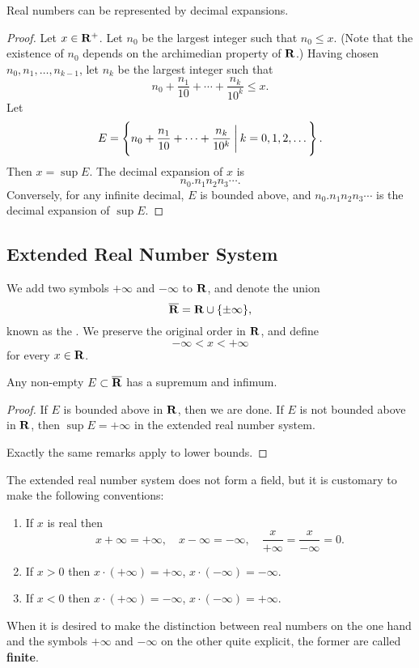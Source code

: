 \begin{proposition}
Real numbers can be represented by decimal expansions.
\end{proposition}

\begin{proof}
Let $x\in\mathbf R^+$. Let $n_0$ be the largest integer such that $n_0\le x$. (Note that the existence of $n_0$ depends on the archimedian property of $\mathbf R$.) Having chosen $n_0,n_1,\dots,n_{k-1}$, let $n_k$ be the largest integer such that
\[n_0+\frac{n_1}{10}+\cdots+\frac{n_k}{10^k}\le x.\]
Let
\[E=\left\{n_0+\frac{n_1}{10}+\cdots+\frac{n_k}{10^k}\:\bigg|\:k=0,1,2,\dots\right\}.\]
Then $x=\sup E$. The decimal expansion of $x$ is
\[n_0.n_1n_2n_3\cdots.\]
Conversely, for any infinite decimal, $E$ is bounded above, and $n_0.n_1n_2n_3\cdots$ is the decimal expansion of $\sup E$.
\end{proof}

\subsection{Extended Real Number System}
\begin{definition}
We add two symbols $+\infty$ and $-\infty$ to $\mathbf R$, and denote the union
\[\overline{\mathbf R}=\mathbf R\cup\{\pm\infty\},\]
known as the . We preserve the original order in $\mathbf R$, and define
\[-\infty<x<+\infty\]
for every $x\in\mathbf R$.
\end{definition}

\begin{proposition}
Any non-empty $E\subset\overline{\mathbf R}$ has a supremum and infimum.
\end{proposition}

\begin{proof}
If $E$ is bounded above in $\mathbf R$, then we are done. If $E$ is not bounded above in $\mathbf R$, then $\sup E=+\infty$ in the extended real number system.

Exactly the same remarks apply to lower bounds.
\end{proof}

The extended real number system does not form a field, but it is customary to make the following conventions:
\begin{enumerate}[label=(\roman*)]
\item If $x$ is real then
\[ x+\infty=+\infty, \quad x-\infty=-\infty, \quad \frac{x}{+\infty}=\frac{x}{-\infty}=0. \]
\item If $x>0$ then $x\cdot(+\infty)=+\infty$, $x\cdot(-\infty)=-\infty$.
\item If $x<0$ then $x\cdot(+\infty)=-\infty$, $x\cdot(-\infty)=+\infty$.
\end{enumerate}
When it is desired to make the distinction between real numbers on the one hand and the symbols $+\infty$ and $-\infty$ on the other quite explicit, the former are called \textbf{finite}.


